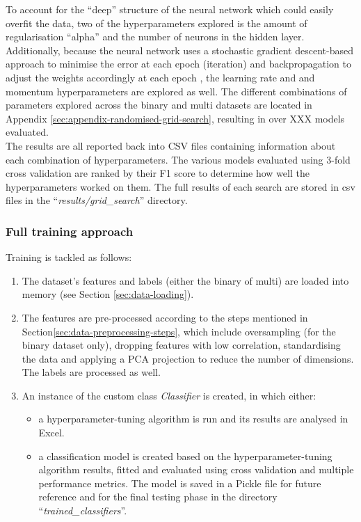 \documentclass[letterpaper,12pt]{article}
\begin{document}
To account for the ``deep'' structure of the neural network which could easily overfit the data, two of the hyperparameters explored is the amount of regularisation ``alpha'' and the number of neurons in the hidden layer. Additionally, because the neural network uses a stochastic gradient descent-based approach to minimise the error at each epoch (iteration) and backpropagation to adjust the weights accordingly at each epoch \cite{russell2016artificial}, the learning rate and and momentum hyperparameters are explored as well. The different combinations of parameters explored across the binary and multi datasets are located in Appendix \ref{sec:appendix-randomised-grid-search}, resulting in over XXX models evaluated.\\

The results are all reported back into CSV files containing information about each combination of hyperparameters. The various models evaluated using  3-fold cross validation are ranked by their F1 score to determine how well the hyperparameters worked on them. The full results of each search are stored in csv files in the ``\textit{results/grid\_search}'' directory.

\subsubsection{Full training approach}
\label{sec:full-training-approach}

Training is tackled as follows:
\begin{enumerate}
    \item The dataset's features and labels (either the binary of multi) are loaded into memory (see  Section \ref{sec:data-loading}).
    \item The features are pre-processed according to the steps mentioned in Section\ref{sec:data-preprocessing-steps}, which include oversampling (for the binary dataset only), dropping features with low correlation, standardising the data and applying a PCA projection  to reduce the number of dimensions. The labels are processed as well.
    \item An instance of the custom class \textit{Classifier} is created, in which either:
    \begin{itemize}
        \item a hyperparameter-tuning algorithm is run and its results are analysed in Excel.
        \item a classification model is created based on the hyperparameter-tuning algorithm results, fitted and evaluated using cross validation and multiple performance metrics. The model is saved in a Pickle file for future reference and for the final testing phase in the directory ``\textit{trained\_classifiers}''.
    \end{itemize}
\end{enumerate}
\end{document}
